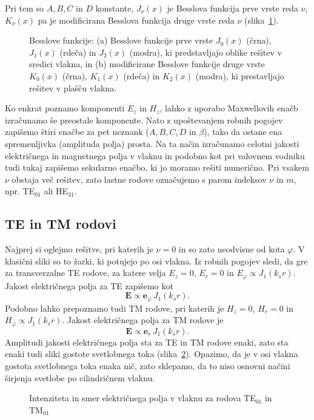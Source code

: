 Pri tem so $A,B,C$ in $D$ konstante, $J_\nu(x)$ je Besslova funkcija prve vrste reda 
$\nu$, $K_\nu(x)$ pa je modificirana Besslova funkcija druge vrste reda $\nu$ 
(slika~\ref{fig:J01}). 
\begin{figure}[h]
\centering
\def\svgwidth{140truemm} 
 
\caption{Besslove funkcije: (a) Besslove funkcije prve vrste 
$J_0(x)$ (črna), $J_1(x)$ (rdeča) in $J_2(x)$ (modra), 
ki predstavljajo oblike rešitev v sredici vlakna, in (b)
modificirane Besslove funkcije druge vrste $K_0(x)$ (črna), $K_1(x)$ (rdeča) in $K_2(x)$ (modra), 
ki prestavljajo rešitev v plašču vlakna.}
\label{fig:J01}
\end{figure}

Ko enkrat poznamo komponenti $E_z$ in $H_z$, lahko z uporabo Maxwellovih enačb izračunamo še 
preostale komponente. Nato z upoštevanjem robnih pogojev zapišemo štiri enačbe za 
pet neznank ($A,B,C,D$ in $\beta$),
tako da ostane ena spremenljivka (amplituda polja) prosta. Na ta način izračunamo celotni 
jakosti električnega in magnetnega polja v vlaknu in podobno kot pri valovnem vodniku 
tudi tukaj zapišemo sekularno enačbo, ki jo moramo rešiti numerično. Pri vsakem $\nu$ obstaja 
več rešitev, zato lastne rodove označujemo s parom indeksov $\nu$ in $m$, npr. TE$_{01}$ ali 
HE$_{31}$.

\subsection*{TE in TM rodovi}
Najprej si oglejmo rešitve, pri katerih je $\nu=0$ in so zato neodvisne od kota $\varphi$. 
V klasični sliki so to žarki, ki potujejo po osi vlakna. Iz robnih pogojev sledi, da 
gre za transverzalne TE rodove, za katere velja $E_z=0$, $E_r=0$ in $E_\varphi \propto J_1(k_sr)$.
Jakost električnega polja za TE zapišemo kot 
\begin{equation}
\mathbf{E} \propto \mathbf{e}_\varphi \, J_1(k_s r).
\end{equation}
Podobno lahko prepoznamo tudi TM rodove, pri katerih je $H_z=0$, $H_r=0$ in $H_\varphi \propto J_1(k_sr)$.
Jakost električnega polja za TM rodove je
\begin{equation}
\mathbf{E} \propto \mathbf{e}_r \, J_1(k_s r).
\end{equation}
Amplitudi jakosti električnega polja sta za TE in TM rodove enaki, zato
sta enaki tudi sliki gostote svetlobnega toka (slika~\ref{fig:TE01}). Opazimo, da je v osi
vlakna gostota svetlobnega toka enaka nič, zato sklepamo, da to niso osnovni načini 
širjenja svetlobe po cilindričnem vlaknu. 
\begin{figure}[h]
\centering
\def\svgwidth{100truemm} 

\caption{Intenziteta in smer električnega polja v vlaknu za rodova TE$_{01}$ in TM$_{01}$
}
\label{fig:TE01}
\end{figure}

